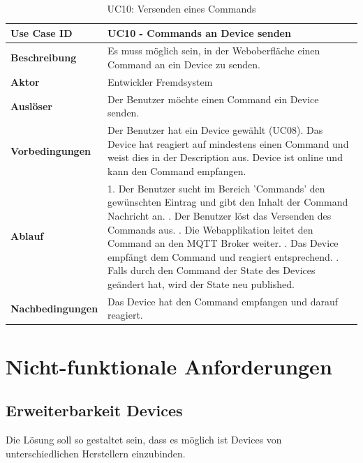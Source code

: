\begin{table}[H]
\begin{tabularx}{\textwidth}{|l|X|}

 \hline
 {\bf Use Case ID }    & UC10 - Commands an Device senden \\  \hline
 {\bf Beschreibung }   & Es muss möglich sein, in der Weboberfläche einen Command an ein Device zu senden. \\ \hline
 {\bf Aktor }          & Entwickler Fremdsystem \\ \hline
 {\bf Auslöser }       & Der Benutzer möchte einen Command ein Device senden. \\ \hline
 {\bf Vorbedingungen } & 
     Der Benutzer hat ein Device gewählt (UC08). \newline
     Das Device hat reagiert auf mindestens einen Command und weist dies in der Description aus. \newline 
     Device ist online und kann den Command empfangen. \\ \hline
 {\bf Ablauf }         & 
     1. Der Benutzer sucht im Bereich 'Commands' den gewünschten Eintrag und gibt den Inhalt der Command Nachricht an. \newline
     2. Der Benutzer löst das Versenden des Commands aus. \newline
     3. Die Webapplikation leitet den Command an den MQTT Broker weiter. \newline
     4. Das Device empfängt dem Command und reagiert entsprechend. \newline
     5. Falls durch den Command der State des Devices geändert hat, wird der State neu published.
     \\ \hline
 {\bf Nachbedingungen} & Das Device hat den Command empfangen und darauf reagiert. \\ \hline
  
\end{tabularx}
\caption{UC10: Versenden eines Commands}
\end{table}




\section{Nicht-funktionale Anforderungen}

\subsection{Erweiterbarkeit Devices}
Die Lösung soll so gestaltet sein, dass es möglich ist Devices von unterschiedlichen Herstellern einzubinden.

